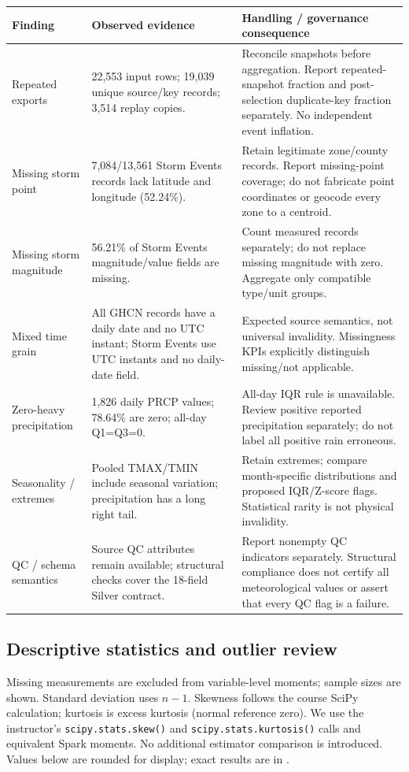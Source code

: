 \documentclass[10pt]{article}
\begin{document}
\begin{longtable}{L{3.0cm}L{5.6cm}L{8.2cm}}
\toprule Finding & Observed evidence & Handling / governance consequence\\\midrule
Repeated exports & 22,553 input rows; 19,039 unique source/key records; 3,514 replay copies. & Reconcile snapshots before aggregation. Report repeated-snapshot fraction and post-selection duplicate-key fraction separately. No independent event inflation.\\
Missing storm point & 7,084/13,561 Storm Events records lack latitude and longitude (52.24\%). & Retain legitimate zone/county records. Report missing-point coverage; do not fabricate point coordinates or geocode every zone to a centroid.\\
Missing storm magnitude & 56.21\% of Storm Events magnitude/value fields are missing. & Count measured records separately; do not replace missing magnitude with zero. Aggregate only compatible type/unit groups.\\
Mixed time grain & All GHCN records have a daily date and no UTC instant; Storm Events use UTC instants and no daily-date field. & Expected source semantics, not universal invalidity. Missingness KPIs explicitly distinguish missing/not applicable.\\
Zero-heavy precipitation & 1,826 daily PRCP values; 78.64\% are zero; all-day Q1=Q3=0. & All-day IQR rule is unavailable. Review positive reported precipitation separately; do not label all positive rain erroneous.\\
Seasonality / extremes & Pooled TMAX/TMIN include seasonal variation; precipitation has a long right tail. & Retain extremes; compare month-specific distributions and proposed IQR/Z-score flags. Statistical rarity is not physical invalidity.\\
QC / schema semantics & Source QC attributes remain available; structural checks cover the 18-field Silver contract. & Report nonempty QC indicators separately. Structural compliance does not certify all meteorological values or assert that every QC flag is a failure.\\
\bottomrule
\end{longtable}

\subsection{Descriptive statistics and outlier review}
Missing measurements are excluded from variable-level moments; sample sizes are
shown. Standard deviation uses $n-1$. Skewness follows the course SciPy calculation;
kurtosis is excess kurtosis (normal reference zero). We use the instructor's
\texttt{scipy.stats.skew()} and \texttt{scipy.stats.kurtosis()} calls and equivalent
Spark moments. No additional estimator comparison is introduced. Values below are
rounded for display; exact results are in .
\end{document}

